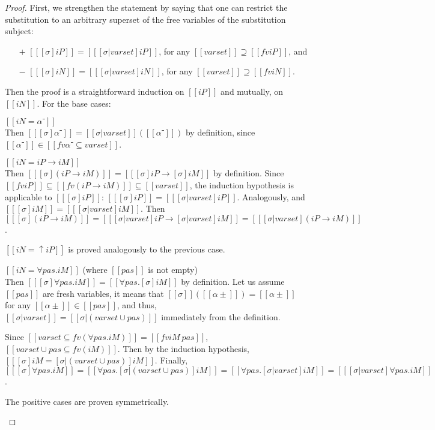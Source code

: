 \lemmaSubstRestrFv*
\begin{proof}
  First, we strengthen the statement by saying that
  one can restrict the substitution to an arbitrary
  superset of the free variables of the substitution subject:
 \begin{itemize}
    \item[$+$] $[[ [σ]iP ]] = [[ [σ|varset]iP ]]$, for any $[[varset]] \supseteq [[fv iP]]$, and
    \item[$-$] $[[ [σ]iN ]] = [[ [σ|varset]iN ]]$, for any $[[varset]] \supseteq [[fv iN]]$.
  \end{itemize}
  Then the proof is a straightforward induction on $[[iP]]$ and mutually, on $[[iN]]$.
  For the base cases: 
  \begin{caseof}
    \item $[[iN = α⁻]]$\\
      Then $[[ [σ]α⁻ ]] = [[σ|varset]] ([[α⁻]])$ by definition, 
      since $[[α⁻]] \in [[fv α⁻ ⊆ varset]]$.
    \item $[[iN = iP → iM]]$\\
      Then $[[ [σ](iP → iM) ]] = [[ [σ]iP → [σ]iM ]]$ by definition.
      Since $[[fv iP]] \subseteq [[fv(iP → iM)]] \subseteq [[varset]]$, 
      the induction hypothesis is applicable to $[[ [σ]iP ]]$: 
      $[[ [σ]iP ]] = [[ [σ|varset]iP ]]$. 
      Analogously, and $[[ [σ]iM ]] = [[ [σ|varset]iM ]]$.
      Then 
      $[[ [σ](iP → iM) ]] = [[ [σ|varset]iP → [σ|varset]iM ]]
       = [[ [σ|varset](iP → iM) ]]$.
    \item $[[iN = ↑iP]]$ is proved analogously to the previous case.
    \item $[[iN = ∀pas.iM ]]$ (where $[[pas]]$ is not empty)\\
      Then $[[ [σ]∀pas.iM ]] = [[ ∀pas.[σ]iM ]]$ by definition.
      Let us assume $[[pas]]$ are fresh variables, 
      it means that $[[σ]]([[α± ]]) = [[α± ]]$ for any 
      $[[α± ]] \in [[pas]]$, and thus, 
      $[[ σ|varset ]] = [[ σ|(varset ∪ {pas}) ]]$
      immediately from the definition. 

      Since $[[varset ⊆ fv(∀pas.iM)]] = [[fv iM \ {pas}]]$,
      $[[varset ∪ {pas} ⊆ fv(iM)]]$.
      Then by the induction hypothesis, 
      $[[ [σ]iM =  [σ|(varset ∪ {pas})]iM ]]$.
      Finally, 
      $[[ [σ]∀pas.iM ]] = [[ ∀pas.[σ|(varset ∪ {pas})]iM ]] = 
      [[ ∀pas.[σ|varset]iM ]] = [[ [σ|varset]∀pas.iM ]]$.
    \item The positive cases are proven symmetrically. 
  \end{caseof}
\end{proof}

